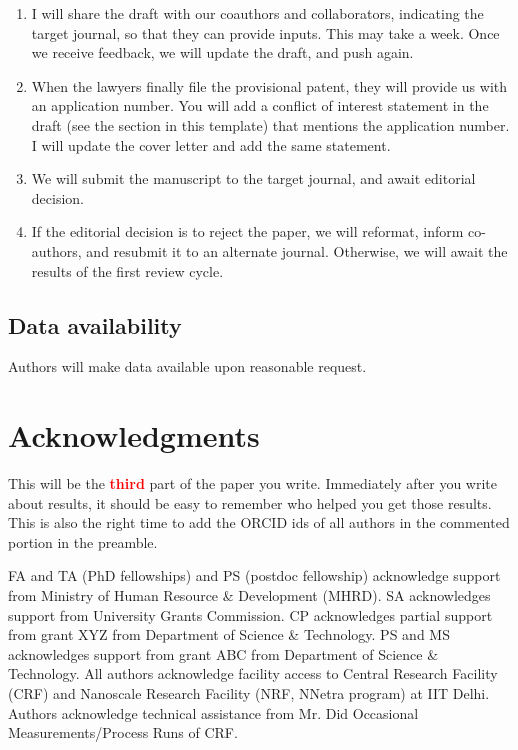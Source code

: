 \documentclass[12pt,twocolumn]{article}
\begin{document}
\begin{enumerate}
\item I will share the draft with our coauthors and collaborators, indicating the target journal, so that they can provide inputs. This may take a week. Once we receive feedback, we will update the draft, and push again.
\item When the lawyers finally file the provisional patent, they will provide us with an application number. You will add a conflict of interest statement in the draft (see the section in this template) that mentions the application number. I will update the cover letter and add the same statement.
\item We will submit the manuscript to the target journal, and await editorial decision.
\item If the editorial decision is to reject the paper, we will reformat, inform co-authors, and resubmit it to an alternate journal. Otherwise, we will await the results of the first review cycle.
\end{enumerate}

\subsection*{Data availability}

Authors will make data available upon reasonable request.

\section*{Acknowledgments}

This will be the \textbf{\Huge \textcolor{red}{third}} part of the paper you write. Immediately after you write about results, it should be easy to remember who helped you get those results. This is also the right time to add the ORCID ids of all authors in the commented portion in the preamble.

FA and TA (PhD fellowships) and PS (postdoc fellowship) acknowledge support from Ministry of Human Resource \& Development (MHRD). SA acknowledges support from University Grants Commission. CP acknowledges partial support from grant XYZ from Department of Science \& Technology. PS and MS acknowledges support from grant ABC from Department of Science \& Technology. All authors acknowledge facility access to Central Research Facility (CRF) and Nanoscale Research Facility (NRF, NNetra program) at IIT Delhi. Authors acknowledge technical assistance from Mr. Did Occasional Measurements/Process Runs of CRF.
\end{document}

